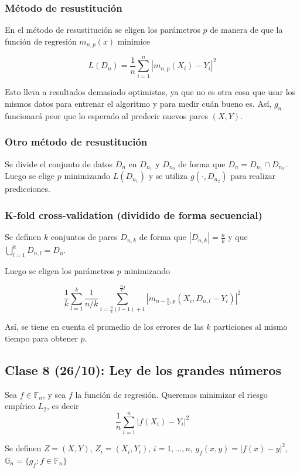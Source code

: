 \documentclass[12pt, a4paper]{article}
\begin{document}
\subsubsection{Método de resustitución}

En el método de resustitución se eligen los parámetros $p$ de manera de que la función de regresión $m_{n,p}(x)$ minimice

$$L(D_n) = \frac{1}{n} \sum_{i=1}^n | m_{n,p}(X_i)-Y_i |^2 $$

Esto lleva a resultados demasiado optimistas, ya que no es otra cosa que usar los mismos datos para entrenar el algoritmo y para medir cuán bueno es. Así, $g_n$ funcionará peor que lo esperado al predecir nuevos pares $(X,Y)$.

\subsubsection{Otro método de resustitución}

Se divide el conjunto de datos $D_n$ en $D_{n_1}$ y $D_{n_2}$ de forma que $D_n=D_{n_1} \cap D_{n_2}$. Luego se elige $p$ minimizando $L(D_{n_1})$ y se utiliza $g(\cdot,D_{n_2})$ para realizar predicciones.

\subsubsection{K-fold cross-validation (dividido de forma secuencial)}

Se definen $k$ conjuntos de pares $D_{n,k}$ de forma que $|D_{n,k}|=\frac{n}{k}$  y que $\bigcup_{l=1}^{k}D_{n,l}=D_n$.

Luego se eligen los parámetros $p$ minimizando

$$ \frac{1}{k} \sum_{l=1}^{k} \frac{1}{n/k} \sum_{i=\frac{n}{k}(l-1)+1}^{\frac{n}{k} l} | m_{n-\frac{n}{k},p}(X_i,D_{n,l} -Y_i) |^2 $$

Así, se tiene en cuenta el promedio de los errores de las $k$ particiones al mismo tiempo para obtener $p$.

\subsection{Clase 8 (26/10): Ley de los grandes números}

Sea $ f\in \mathds{F}_n$, y sea $f$ la función de regresión. Queremos minimizar el riesgo empírico $L_2$, es decir $$ \frac{1}{n} \sum_{i=1}^n |f(X_i)-Y_i|^2 $$

Se definen $Z=(X,Y)$, $Z_i=(X_i,Y_i)$, $i=1, ..., n$, $g_f(x,y)=|f(x)-y|^2$, $\mathds{G}_n=\{ g_f :f \in \mathds{F}_n\}$
\end{document}
